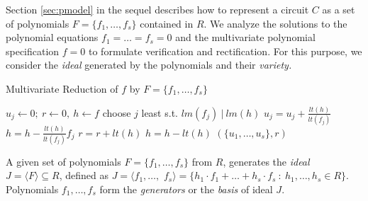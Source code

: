 Section \ref{sec:pmodel} in the sequel describes how to represent a circuit $C$ as a set of 
polynomials $F=\{f_1,\dots,f_s\}$ contained in $R$. We analyze the solutions 
to the polynomial equations $f_1=\dots=f_s=0$ and the multivariate polynomial specification $f=0$ 
to formulate verification and rectification.
For this purpose, we consider the {\it ideal} generated by the polynomials and their {\it
  variety.} 

\begin{algorithm}[hbt]
 \caption{Multivariate Reduction of $f$ by $F=\{f_1,\dots,f_s\}$}
 \label{algo:mv_reduce}
 \begin{algorithmic}[1]
 \State $u_j \gets 0; ~r \gets 0, ~h \gets f $ 
 \State choose $j$ least s.t. $lm(f_j) ~|~ lm(h)$
 \State $u_j = u_j + \frac{lt(h)}{lt(f_j)}$
 \State $h = h - \frac{lt(h)}{lt(f_j)} f_j$
 \Else
 \State $r = r+ lt(h)$
 \State $h = h - lt(h)$
 \EndIf
 \EndWhile
 \State \Return $(\{u_1,\dots,u_s\} , r)$
 \EndProcedure
 \end{algorithmic}
 \end{algorithm}



 A given set of polynomials 
$F=\{f_1,\dots,f_s\}$ from $R$, generates the {\it ideal} $J = \langle
F \rangle \subseteq R$, defined as $J = \langle f_1,\dots,$ $ f_s \rangle = \{
h_1\cdot f_1 + \dots+h_s\cdot f_s~:~h_1,\dots,h_s\in R\}$. 
Polynomials $f_1,\dots,f_s$ form the {\it generators} or the {\it basis} of ideal $J$.



